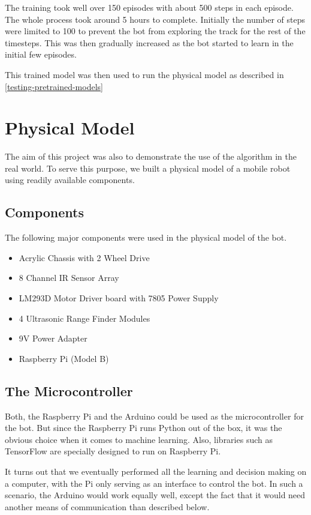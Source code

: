 \documentclass[12pt]{extreport}
\begin{document}
The training took well over 150 episodes with about 500 steps in each episode. The whole process took around 5 hours to complete. Initially the number of steps were limited to 100 to prevent the bot from exploring the track for the rest of the timesteps. This was then gradually increased as the bot started to learn in the initial few episodes.

This trained model was then used to run the physical model as described in \autoref{testing-pretrained-models}

\chapter{Physical Model}
The aim of this project was also to demonstrate the use of the algorithm in the real world. To serve this purpose, we built a physical model of a mobile robot using readily available components.

\section{Components}
The following major components were used in the physical model of the bot.
\begin{itemize}
 \item Acrylic Chassis with 2 Wheel Drive
 \item 8 Channel IR Sensor Array
 \item LM293D Motor Driver board with 7805 Power Supply
 \item 4 Ultrasonic Range Finder Modules
 \item 9V Power Adapter
 \item Raspberry Pi (Model B)
\end{itemize}

\section{The Microcontroller}
Both, the Raspberry Pi and the Arduino could be used as the microcontroller for the bot. But since the Raspberry Pi runs Python out of the box, it was the obvious choice when it comes to machine learning. Also, libraries such as TensorFlow are specially designed to run on Raspberry Pi.

It turns out that we eventually performed all the learning and decision making on a computer, with the Pi only serving as an interface to control the bot. In such a scenario, the Arduino would work equally well, except the fact that it would need another means of communication than described below.
\end{document}
